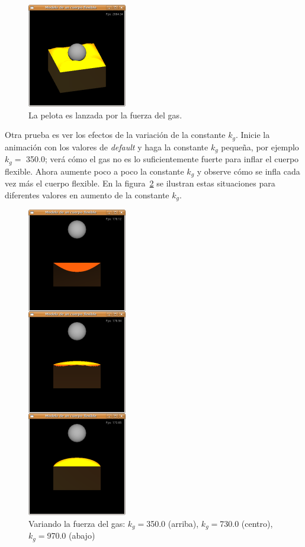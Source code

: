 \begin{figure}
 \centering
 \includegraphics[]{Img/modPres3}
 \caption[Ejecución con la esfera lanzada por la fuerza del gas]{La pelota es lanzada por la fuerza del gas.}
 \label{pres:test3}
\end{figure}

Otra prueba es ver los efectos de la variación de la constante $k_g$.
Inicie la animación con los valores de \emph{\foreignlanguage{english}{default}} y haga la constante $k_g$ pequeña, por ejemplo $k_g =$ 350.0; verá cómo el gas no es lo suficientemente fuerte para inflar el cuerpo flexible.
Ahora aumente poco a poco la constante $k_g$ y observe cómo se infla cada vez más el cuerpo flexible.
En la figura~\ref{pres:test4} se ilustran estas situaciones para diferentes valores en aumento de la constante $k_g$.

\begin{figure}
 \centering
 \includegraphics[]{Img/modPres4}
 \caption[Ejecución con diferentes valores de la constante de gas]{Variando la fuerza del gas: $k_g=$350.0 (arriba), $k_g=$730.0 (centro), $k_g=$970.0 (abajo)}
 \label{pres:test4}
\end{figure}

